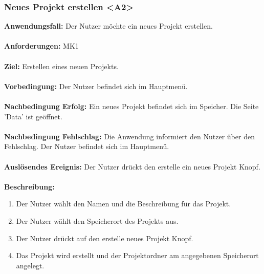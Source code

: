 \documentclass[parskip=full]{scrartcl} %
\begin{document}
\subsubsection*{Neues Projekt erstellen <A2>}
\textbf{Anwendungsfall:} Der Nutzer möchte ein neues Projekt erstellen.\\\\
\textbf{Anforderungen:} MK1\\\\
\textbf{Ziel:} Erstellen eines neuen Projekts. \\\\
\textbf{Vorbedingung:} Der Nutzer befindet sich im Hauptmenü. \\\\
\textbf{Nachbedingung Erfolg:} Ein neues Projekt befindet sich im Speicher. Die Seite 'Data' ist geöffnet.  \\\\
\textbf{Nachbedingung Fehlschlag:} Die Anwendung informiert den Nutzer über den Fehlschlag. Der Nutzer befindet sich im Hauptmenü. \\\\
\textbf{Auslösendes Ereignis:} Der Nutzer drückt den erstelle ein neues Projekt Knopf. \\\\
\textbf{Beschreibung:}
\begin{enumerate}
    \item Der Nutzer wählt den Namen und die Beschreibung für das Projekt.
    \item Der Nutzer wählt den Speicherort des Projekts aus.
    \item Der Nutzer drückt auf den erstelle neues Projekt Knopf.
    \item Das Projekt wird erstellt und der Projektordner am angegebenen Speicherort angelegt.
\end{enumerate}
\newpage
\end{document}
